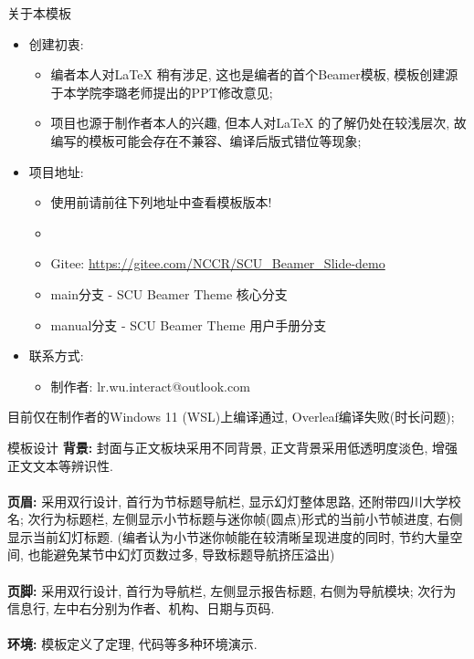 \documentclass[hyperref, UTF8, CJK, aspectratio=169]{beamer}
\begin{document}
\begin{frame}{关于本模板}%
	\begin{itemize}
		\item 创建初衷:
		\begin{itemize}
			\item 编者本人对\LaTeX{} 稍有涉足, 这也是编者的首个Beamer模板, 模板创建源于本学院李璐老师提出的PPT修改意见;
			\item 项目也源于制作者本人的兴趣, 但本人对\LaTeX{} 的了解仍处在较浅层次, 故编写的模板可能会存在不兼容、编译后版式错位等现象;
		\end{itemize}
		\item 项目地址:
		\begin{itemize}
			\item 使用前请前往下列地址中查看模板版本!
			\item \faGithub{}
			\item Gitee: \color{scublue}\url{https://gitee.com/NCCR/SCU_Beamer_Slide-demo}
			\item main分支 - SCU Beamer Theme 核心分支\label{back:BranchMain} 
			\item manual分支 - SCU Beamer Theme 用户手册分支\label{back:BranchManual} 
		\end{itemize}
		\item 联系方式:
		\begin{itemize}
			\item 制作者: lr.wu.interact@outlook.com
		\end{itemize}
	\end{itemize}
	目前仅在制作者的Windows 11 (WSL)上编译通过, Overleaf编译失败(时长问题);
\end{frame}

\begin{frame}{模板设计}
	\textbf{背景:} 封面与正文板块采用{\color{scured}不同背景}, 正文背景采用{\color{scured}低透明度淡色}, 增强正文文本等辨识性.\\~\\
	\textbf{页眉:} 采用双行设计, 首行为{\color{scured}节标题导航栏}, 显示幻灯整体思路, 还附带四川大学校名; 次行为标题栏, 左侧显示{\color{scured}小节标题}与{\color{scured}迷你帧(圆点)形式的当前小节帧进度}, 右侧显示当前{\color{scured}幻灯标题}. (编者认为小节迷你帧能在较清晰呈现进度的同时, 节约大量空间, 也能避免某节中幻灯页数过多, 导致标题导航挤压溢出)\\~\\
	\textbf{页脚:} 采用双行设计, 首行为导航栏, 左侧显示{\color{scured}报告标题}, 右侧为{\color{scured}导航模块}; 次行为信息行, 左中右分别为{\color{scured}作者}、{\color{scured}机构}、{\color{scured}日期与页码}.\\~\\
	\textbf{环境:} 模板定义了{\color{scured}定理}, {\color{scured}代码}等多种环境演示.
\end{frame}
\end{document}
